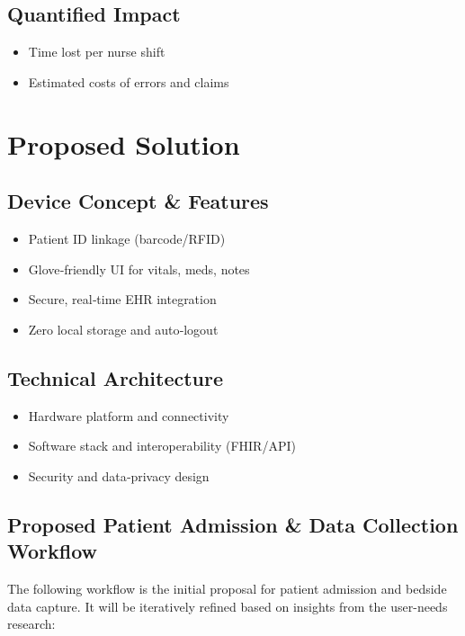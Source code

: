 \documentclass[a4paper,11pt]{article}
\begin{document}
\subsection{Quantified Impact}
\begin{itemize}
  \item Time lost per nurse shift
  \item Estimated costs of errors and claims
\end{itemize}

\section{Proposed Solution}
\subsection{Device Concept \& Features}
\begin{itemize}
  \item Patient ID linkage (barcode/RFID)
  \item Glove‐friendly UI for vitals, meds, notes
  \item Secure, real‐time EHR integration
  \item Zero local storage and auto‐logout
\end{itemize}
\subsection{Technical Architecture}
\begin{itemize}
  \item Hardware platform and connectivity
  \item Software stack and interoperability (FHIR/API)
  \item Security and data‐privacy design
\end{itemize}

\subsection{Proposed Patient Admission \& Data Collection Workflow}

The following workflow is the initial proposal for patient admission and bedside data capture.  It will be iteratively refined based on insights from the user-needs research:
\end{document}
